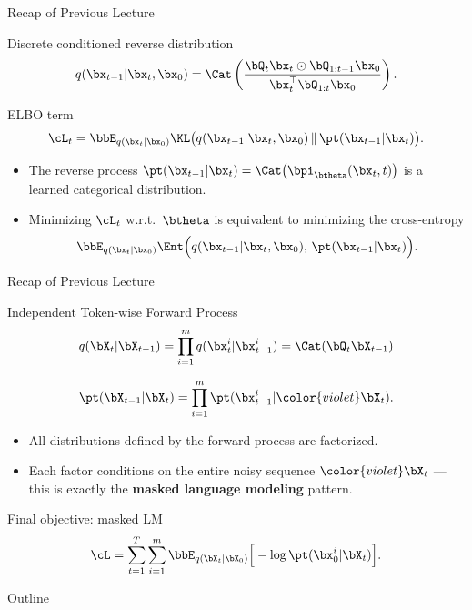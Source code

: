 \documentclass{beamer}
\begin{document}
\begin{frame}{Recap of Previous Lecture}
	\begin{block}{Discrete conditioned reverse distribution}
		\[
			q(\bx_{t-1} | \bx_t, \bx_0)
			= \Cat\left(\frac{\bQ_t \bx_t \odot \bQ_{1:t-1} \bx_0}{\bx_t^{\top}\bQ_{1:t}\bx_0}\right).
		\]
		\vspace{-0.3cm}
	\end{block}
	\begin{block}{ELBO term}
		\vspace{-0.3cm}
		\[
			\cL_t
			= \bbE_{q(\bx_t | \bx_0)}
			\KL\bigl(q(\bx_{t-1} | \bx_t, \bx_0) \,\|\, \pt(\bx_{t-1} | \bx_t)\bigr).
		\]
		\vspace{-0.3cm}
	\end{block}
	\begin{itemize}
		\item The reverse process $\pt(\bx_{t-1} | \bx_t) = \Cat\bigl( \bpi_{\btheta}(\bx_t, t) \bigr)$ is a learned categorical distribution.
		\item Minimizing $\cL_t$ w.r.t.~$\btheta$ is equivalent to minimizing the cross-entropy
		\[
			\bbE_{q(\bx_t | \bx_0)}
			\Ent\Bigl(q(\bx_{t-1} | \bx_t, \bx_0),\, \pt(\bx_{t-1} | \bx_t)\Bigr).
		\]
	\end{itemize}
\end{frame}
\begin{frame}{Recap of Previous Lecture}
	\begin{block}{Independent Token-wise Forward Process}
		\vspace{-0.3cm}
		\[
			q(\bX_t |\bX_{t-1}) =
			\prod_{i=1}^m q(\bx_t^i |\bx_{t-1}^i) = \Cat(\bQ_t \bX_{t-1})
		\]
		\vspace{-0.3cm}
	\end{block}
	\[
		\pt(\bX_{t-1}|\bX_t) =
		\prod_{i=1}^m \pt(\bx_{t-1}^i | {\color{violet}\bX_t}).
	\]
	\vspace{-0.3cm}
	\begin{itemize}
		\item All distributions defined by the forward process are factorized.
		\item Each factor conditions on the entire noisy sequence ${\color{violet}\bX_t}$ --- this is exactly the \textbf{masked language modeling} pattern.
	\end{itemize}
	\begin{block}{Final objective: masked LM}
		\vspace{-0.3cm}
		\[
			\cL =
			\sum_{t=1}^T \sum_{i=1}^m
			\bbE_{q(\bX_t|\bX_0)}
			\Big[-\log \pt(\bx_0^i |\bX_t)\Big].
		\]
	\end{block}
\end{frame}
\begin{frame}{Outline}
	\tableofcontents
\end{frame}
\end{document}
